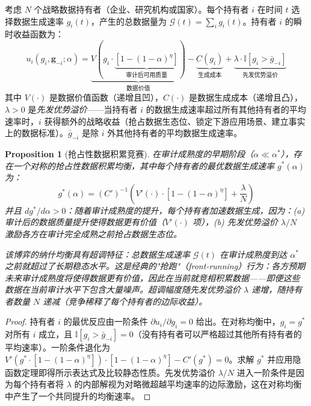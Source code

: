 \documentclass[12pt,a4paper]{ctexart}
\newtheorem{proposition}[theorem]{Proposition}
\theoremstyle{definition}
\theoremstyle{remark}
\begin{document}
考虑 $N$ 个战略数据持有者（企业、研究机构或国家）。每个持有者 $i$ 在时间 $t$ 选择数据生成速率 $g_i(t)$，产生的总数据量为 $\mathcal{G}(t) = \sum_i g_i(t)$。持有者 $i$ 的瞬时收益函数为：
\begin{equation}
u_i(g_i, \mathbf{g}_{-i}; \alpha) = \underbrace{V\left(g_i \cdot \underbrace{\left[1 - (1-\alpha)^{\eta}\right]}_{\text{审计后可用质量}}\right)}_{\text{数据价值}} - \underbrace{C(g_i)}_{\text{生成成本}} + \underbrace{\lambda \cdot \mathbb{I}\left[g_i > \bar{g}_{-i}\right]}_{\text{先发优势溢价}}
\end{equation}
其中 $V(\cdot)$ 是数据价值函数（递增且凹），$C(\cdot)$ 是数据生成成本（递增且凸），$\lambda > 0$ 是\textit{先发优势溢价}——当持有者 $i$ 的数据生成速率超过所有其他持有者的平均速率时，$i$ 获得额外的战略收益（抢占数据生态位、锁定下游应用场景、建立事实上的数据标准）。$\bar{g}_{-i}$ 是除 $i$ 外其他持有者的平均数据生成速率。

\begin{proposition}[抢占性数据积累竞赛]
\label{prop:preemptive}
在审计成熟度的早期阶段（$\alpha \ll \alpha^*$），存在一个对称的抢占性数据积累均衡，其中每个持有者的最优数据生成速率 $g^*(\alpha)$ 为：
\begin{equation}
g^*(\alpha) = (C')^{-1}\left(V'(\cdot) \cdot [1 - (1-\alpha)^{\eta}] + \frac{\lambda}{N}\right)
\end{equation}
并且 $dg^*/d\alpha > 0$：随着审计成熟度的提升，每个持有者\textit{加速}数据生成，因为：(a) 审计后的数据质量提升使得数据更有价值（$V'(\cdot)$ 项），(b) 先发优势溢价 $\lambda/N$ 激励各方在审计完全成熟之前抢占数据生态位。

该博弈的纳什均衡具有\textit{超调}特征：总数据生成速率 $\mathcal{G}(t)$ 在审计成熟度到达 $\alpha^*$ 之前就超过了长期稳态水平。这是经典的"抢跑"（front-running）行为：各方预期未来审计成熟度将使得数据更有价值，因此在当前就竞相积累数据——即便这些数据在当前审计水平下包含大量噪声。超调幅度随先发优势溢价 $\lambda$ 递增，随持有者数量 $N$ 递减（竞争稀释了每个持有者的边际收益）。
\end{proposition}

\begin{proof}
持有者 $i$ 的最优反应由一阶条件 $\partial u_i / \partial g_i = 0$ 给出。在对称均衡中，$g_i = g^*$ 对所有 $i$ 成立，且 $\mathbb{I}[g_i > \bar{g}_{-i}] = 0$（没有持有者可以严格超过其他所有持有者的平均速率）。一阶条件退化为 $V'(g^* \cdot [1 - (1-\alpha)^{\eta}]) \cdot [1 - (1-\alpha)^{\eta}] - C'(g^*) = 0$。求解 $g^*$ 并应用隐函数定理即得所示表达式及比较静态性质。先发优势溢价 $\lambda/N$ 进入一阶条件是因为每个持有者将 $\lambda$ 的内部解视为对略微超越平均速率的边际激励，这在对称均衡中产生了一个共同提升的均衡速率。
\end{proof}
\end{document}
